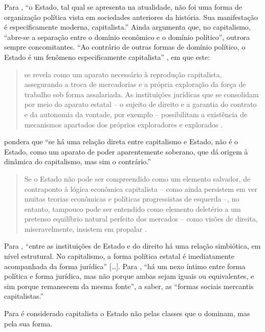 \documentclass[]{article}
\begin{document}
Para , ``o Estado, tal qual se apresenta na
atualidade, não foi uma forma de organização política vista em
sociedades anteriores da história. Sua manifestação é especificamente
moderna, capitalista.'' Ainda  argumenta que,
no capitalismo, ``abre-se a separação entre o domínio econômico e o
domínio político'', outrora sempre concomitantes. ``Ao contrário de
outras formas de domínio político, o Estado é um fenômeno
especificamente capitalista'' \cite[p.~18]{mascaro}, em que este:

\begin{quote}
se revela como um aparato necessário à reprodução capitalista,
assegurando a troca de mercadorias e a própria exploração da força de
trabalho sob forma assalariada. As instituições jurídicas que se
consolidam por meio do aparato estatal -- o sujeito de direito e a
garantia do contrato e da autonomia da vontade, por exemplo --
possibilitam a existência de mecanismos apartados dos próprios
exploradores e explorados \cite[p.~18]{mascaro}.
\end{quote}

 pondera que ``se há uma relação direta entre
capitalismo e Estado, não é o Estado, como um aparato de poder
aparentemente soberano, que dá origem à dinâmica do capitalismo, mas sim
o contrário.''

\begin{quote}
Se o Estado não pode ser compreendido como um elemento salvador, de
contraponto à lógica econômica capitalista -- como ainda persistem em
ver muitas teorias econômicas e políticas progressistas de esquerda --,
no entanto, tampouco pode ser entendido como elemento deletério a um
pretenso equilíbrio natural perfeito dos mercados -- como visões de
direita, miseravelmente, insistem em propalar \cite[p.~115]{mascaro}.
\end{quote}

Para , ``entre as instituições de Estado e do
direito há uma relação simbiótica, em nível estrutural. No capitalismo,
a forma política estatal é imediatamente acompanhada da forma jurídica''
{[}\ldots{}{]}. Para , ``há um nexo íntimo
entre forma política e forma jurídica, mas não porque ambas sejam iguais
ou equivalentes, e sim porque remanescem da mesma fonte'', a saber, as
``formas sociais mercantis capitalistas.''

Para  é considerado capitalista o Estado não
pelas classes que o dominam, mas pela sua forma.
\end{document}
